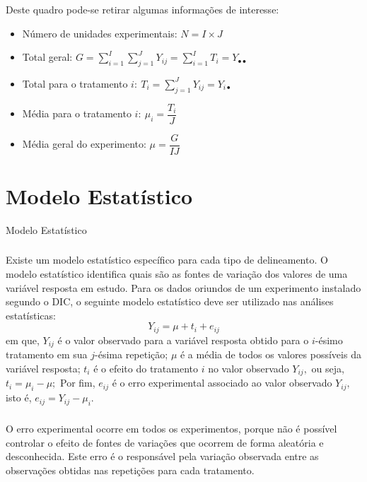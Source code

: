 \documentclass[14pt,aspectratio=1610]{beamer}
\begin{document}
\begin{frame}{}
\frametitle{}
\begin{block}{}
\justifying
Deste quadro pode-se retirar algumas informações de interesse:
\begin{itemize}
\item Número de unidades experimentais: $N=I\times J$\pause
\item Total geral: $G={\displaystyle \sum_{i=1}^{I}\sum_{j=1}^{J}Y_{ij}=\sum_{i=1}^{I}T_{i}=Y_{\bullet \bullet}}$\pause
\item Total para o tratamento $i:\ T_{i}={\displaystyle \sum_{j=1}^{J}Y_{ij}=Y_{i\bullet}}$\pause
\item Média para o tratamento $i:\ \mu_{i}=\dfrac{T_{i}}{J}$\pause
\item Média geral do experimento: $\mu=\dfrac{G}{IJ}$
\end{itemize}
\end{block}
\end{frame}

\section{Modelo Estatístico}
\begin{frame}{Modelo Estatístico}
\frametitle{}
\begin{block}{}
\justifying
Existe um modelo estatístico específico para cada tipo de delineamento. O modelo
estatístico identifica quais são as fontes de variação dos valores de uma variável resposta em estudo. Para os dados oriundos de um experimento instalado segundo o DIC, o seguinte modelo estatístico deve ser utilizado nas análises estatísticas:
$$Y_{ij}=\mu+t_{i}+e_{ij}$$
em que, $Y_{ij}$ é o valor observado para a variável resposta obtido para o $i$-ésimo tratamento em sua $j$-ésima repetição; $\mu$ é a média de todos os valores possíveis da variável resposta; $t_{i}$ é o efeito do tratamento $i$ no valor observado $Y_{ij},$ ou seja, $t_{i}=\mu_{i}-\mu;$ Por fim, $e_{ij}$ é o erro experimental associado ao valor observado $Y_{ij},$ isto é, $e_{ij}=Y_{ij}-\mu_{i}.$
\end{block}
\end{frame}

\begin{frame}{}
\frametitle{}
\begin{block}{}
\justifying
O erro experimental ocorre em todos os experimentos, porque não é possível controlar o efeito de fontes de variações que ocorrem de forma aleatória e desconhecida. Este erro é o responsável pela variação observada entre as observações obtidas nas repetições para cada tratamento.
\end{block}
\end{frame}
\end{document}
